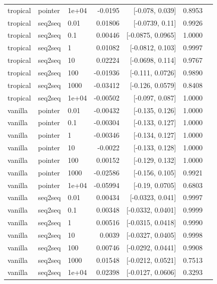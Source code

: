 \documentclass[10pt]{article}
\begin{document}
{\begin{longtable}{lllrrrl}
tropical & pointer & 1e+04 & -0.0195 & [-0.078, 0.039] & 0.8953 & \\
tropical & seq2seq & 0.01 & 0.01806 & [-0.0739, 0.11] & 0.9926 & \\
tropical & seq2seq & 0.1 & 0.00446 & [-0.0875, 0.0965] & 1.0000 & \\
tropical & seq2seq & 1 & 0.01082 & [-0.0812, 0.103] & 0.9997 & \\
tropical & seq2seq & 10 & 0.02224 & [-0.0698, 0.114] & 0.9767 & \\
tropical & seq2seq & 100 & -0.01936 & [-0.111, 0.0726] & 0.9890 & \\
tropical & seq2seq & 1000 & -0.03412 & [-0.126, 0.0579] & 0.8408 & \\
tropical & seq2seq & 1e+04 & -0.00502 & [-0.097, 0.087] & 1.0000 & \\
vanilla & pointer & 0.01 & -0.00432 & [-0.135, 0.126] & 1.0000 & \\
vanilla & pointer & 0.1 & -0.00304 & [-0.133, 0.127] & 1.0000 & \\
vanilla & pointer & 1 & -0.00346 & [-0.134, 0.127] & 1.0000 & \\
vanilla & pointer & 10 & -0.0022 & [-0.133, 0.128] & 1.0000 & \\
vanilla & pointer & 100 & 0.00152 & [-0.129, 0.132] & 1.0000 & \\
vanilla & pointer & 1000 & -0.02586 & [-0.156, 0.105] & 0.9921 & \\
vanilla & pointer & 1e+04 & -0.05994 & [-0.19, 0.0705] & 0.6803 & \\
vanilla & seq2seq & 0.01 & 0.00434 & [-0.0323, 0.041] & 0.9997 & \\
vanilla & seq2seq & 0.1 & 0.00348 & [-0.0332, 0.0401] & 0.9999 & \\
vanilla & seq2seq & 1 & 0.00516 & [-0.0315, 0.0418] & 0.9990 & \\
vanilla & seq2seq & 10 & 0.0039 & [-0.0327, 0.0405] & 0.9998 & \\
vanilla & seq2seq & 100 & 0.00746 & [-0.0292, 0.0441] & 0.9908 & \\
vanilla & seq2seq & 1000 & 0.01548 & [-0.0212, 0.0521] & 0.7513 & \\
vanilla & seq2seq & 1e+04 & 0.02398 & [-0.0127, 0.0606] & 0.3293 & \\
\bottomrule
\end{longtable}
}
\end{document}

